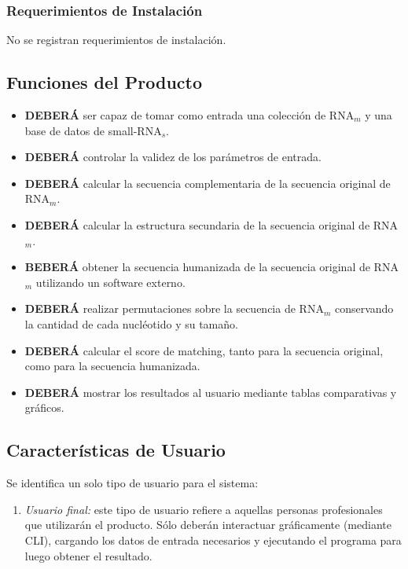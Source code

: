\documentclass[12pt,a4paper,spanish]{article}
\begin{document}
	\subsubsection{Requerimientos de Instalación}
		No se registran requerimientos de instalación.

\subsection{Funciones del Producto}
	\begin{itemize}
		\item \textbf{DEBERÁ} ser capaz de tomar como entrada una colección de RNA$_m$ y una base de datos de small-RNA$_s$. 
		\item \textbf{DEBERÁ} controlar la validez de los parámetros de entrada.
		\item \textbf{DEBERÁ} calcular la secuencia complementaria de la secuencia original de RNA$_m$.
		\item \textbf{DEBERÁ} calcular la estructura secundaria de la secuencia original de RNA$_m$.
		\item \textbf{BEBERÁ} obtener la secuencia humanizada de la secuencia original de RNA$_m$ utilizando un software 									externo.
		\item \textbf{DEBERÁ} realizar permutaciones sobre la secuencia de RNA$_m$ conservando la cantidad de cada 									nucléotido y su tamaño.
		\item \textbf{DEBERÁ} calcular el score de matching, tanto para la secuencia original, como para la secuencia 								humanizada.	
		\item \textbf{DEBERÁ} mostrar los resultados al usuario mediante tablas comparativas y gráficos.		
	\end{itemize}

\subsection{Características de Usuario}
	Se identifica un solo tipo de usuario para el sistema:
	\begin{enumerate}
 		\item \textit{Usuario final:} este tipo de usuario refiere a aquellas personas profesionales que utilizarán el 										producto. Sólo deberán interactuar gráficamente (mediante CLI), cargando los datos de 										entrada necesarios y ejecutando el programa para luego obtener el resultado. 
	\end{enumerate}
\end{document}
